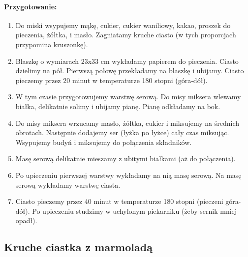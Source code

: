 \documentclass{article}
\begin{document}
    \paragraph{Przygotowanie:}
    \begin{enumerate}
        \item Do miski wsypujemy mąkę, cukier, cukier waniliowy, kakao, proszek
            do pieczenia, żółtka, i masło. Zagniatamy kruche ciasto (w tych
            proporcjach przypomina kruszonkę).
        \item Blaszkę o wymiarach 23x33 cm wykładamy papierem do pieczenia.
            Ciasto dzielimy na pół. Pierwszą połowę przekładamy na blaszkę i
            ubijamy.  Ciasto pieczemy przez 20 minut w temperaturze 180 stopni
            (góra-dół).
        \item W tym czasie przygotowujemy warstwę serową. Do misy miksera
            wlewamy białka, delikatnie solimy i ubijamy pianę. Pianę odkładamy
            na bok.
        \item Do misy miksera wrzucamy masło, żółtka, cukier i miksujemy na
            średnich obrotach. Następnie dodajemy ser (łyżka po łyżce) cały czas
            miksując.  Wsypujemy budyń i miksujemy do połączenia składników.
        \item Masę serową delikatnie mieszamy z ubitymi białkami (aż do
            połączenia).
        \item Po upieczeniu pierwszej warstwy wykładamy na nią masę serową. Na
            masę serową wykładamy warstwę ciasta.
        \item Ciasto pieczemy przez 40 minut w temperaturze 180 stopni (pieczeni
            góra-dół). Po upieczeniu studzimy w uchylonym piekarniku (żeby
            sernik mniej opadł).
    \end{enumerate}
    \newpage


    \subsection{Kruche ciastka z marmoladą}
    \bigskip
\end{document}
